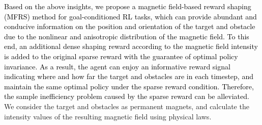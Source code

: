 \documentclass[journal]{IEEEtran}
\begin{document}
\textcolor{black}{Based on the above insights, we propose a magnetic field-based reward shaping (MFRS) method for goal-conditioned RL tasks, which can provide abundant and conducive information on the position and orientation of the target and obstacle due to the nonlinear and anisotropic distribution of the magnetic field.
To this end, an additional dense shaping reward according to the magnetic field intensity is added to the original sparse reward with the guarantee of optimal policy invariance.
As a result, the agent can enjoy an informative reward signal indicating where and how far the target and obstacles are in each timestep, and maintain the same optimal policy under the sparse reward condition.
Therefore, the sample inefficiency problem caused by the sparse reward can be alleviated.}
We consider the target and obstacles as permanent magnets, and calculate the intensity values of the resulting magnetic field using physical laws.
\end{document}
